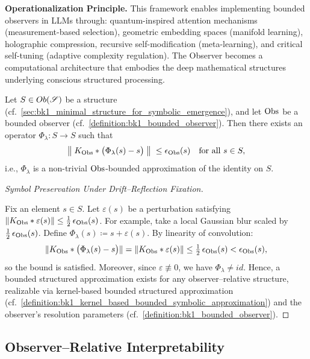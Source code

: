 \begin{definition}
\textbf{Operationalization Principle.}  
This framework enables implementing bounded observers in LLMs through: quantum-inspired attention mechanisms (measurement-based selection), geometric embedding spaces (manifold learning), holographic compression, recursive self-modification (meta-learning), and critical self-tuning (adaptive complexity regulation). The Observer becomes a computational architecture that embodies the deep mathematical structures underlying conscious structured processing.
\end{definition}

\begin{proposition}
\label{proposition:bk1_observer_relative_bounded_approximation}
Let \(S \in Ob(\mathscr{S})\) be a structure (cf.~\ref{sec:bk1_minimal_structure_for_symbolic_emergence}), and let \(\mathrm{Obs}\) be a bounded observer (cf.~\ref{definition:bk1_bounded_observer}).  
Then there exists an operator \(\Phi_\lambda\colon S \to S\) such that
\[
\bigl\|\;K_{\mathrm{Obs}} * \bigl(\Phi_\lambda(s)-s\bigr)\;\bigr\|\; \le \epsilon_{\mathrm{Obs}}(s)
\quad\text{for all } s \in S,
\]
i.e., \(\Phi_\lambda\) is a non-trivial \(\mathrm{Obs}\)-bounded approximation of the identity on \(S\).
\end{proposition}


\begin{proof}[Symbol Preservation Under Drift–Reflection Fixation]
\label{proof:bk1_fix_s_in_s}
\leavevmode

Fix an element \(s \in S\).  
Let \(\varepsilon(s)\) be a perturbation satisfying  
\(\lVert K_{\mathrm{Obs}} * \varepsilon(s)\rVert \le \tfrac12\,\epsilon_{\mathrm{Obs}}(s)\).  
For example, take a local Gaussian blur scaled by \(\tfrac12\,\epsilon_{\mathrm{Obs}}(s)\).  
Define \(\Phi_\lambda(s) \coloneqq s + \varepsilon(s)\).  
By linearity of convolution:
\[
\lVert K_{\mathrm{Obs}} * \bigl(\Phi_\lambda(s) - s\bigr)\rVert
= \lVert K_{\mathrm{Obs}} * \varepsilon(s)\rVert
\le \tfrac12\,\epsilon_{\mathrm{Obs}}(s)
< \epsilon_{\mathrm{Obs}}(s),
\]
so the bound is satisfied.  
Moreover, since \(\varepsilon \not\equiv 0\), we have \(\Phi_\lambda \neq id\).  
Hence, a bounded structured approximation exists for any observer–relative structure, realizable via kernel-based bounded structured approximation (cf.~\ref{definition:bk1_kernel_based_bounded_symbolic_approximation}) and the observer’s resolution parameters (cf.~\ref{definition:bk1_bounded_observer}).
\end{proof}
\subsection*{Observer–Relative Interpretability}
\label{subsec:bk1_observer_relative_interpretability}

